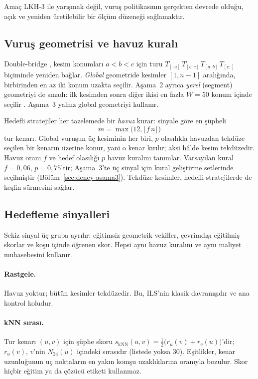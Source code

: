 \documentclass[pdflatex,sn-basic]{sn-jnl}
\begin{document}
Amaç LKH-3 ile yarışmak değil, vuruş politikasının gerçekten devrede olduğu, açık ve yeniden
üretilebilir bir ölçüm düzeneği sağlamaktır.

\subsection{Vuruş geometrisi ve havuz kuralı}\label{sec:yontem-kick}

Double-bridge \citep{martin_1992_largestep, lourenco_2010_ils}, kesim konumları $a<b<c$ için turu
$T_{[:a]}\,T_{[b:c]}\,T_{[a:b]}\,T_{[c:]}$ biçiminde yeniden bağlar. \emph{Global} geometride
kesimler $[1,n-1]$ aralığında, birbirinden en az iki konum uzakta seçilir. Aşama~2 ayrıca
\emph{yerel} (segment) geometriyi de sınadı: ilk kesimden sonra diğer ikisi en fazla $W=50$ konum
içinde seçilir \citep{applegate_2003_clk}. Aşama~3 yalnız global geometriyi kullanır.

Hedefli stratejiler her tazelemede bir \emph{havuz} kurar: sinyale göre en şüpheli
\[
  m=\max\bigl(12,\lfloor f\,n\rfloor\bigr)
\]
tur kenarı. Global vuruşun üç kesiminin her biri, $p$ olasılıkla havuzdan tekdüze seçilen bir
kenarın üzerine konur, yani o kenar kırılır; aksi hâlde kesim tekdüzedir. Havuz oranı $f$ ve hedef
olasılığı $p$ havuz kuralını tanımlar. Varsayılan kural $f=0{,}06$, $p=0{,}75$'tir; Aşama~3'te üç
sinyal için kural geliştirme setlerinde seçilmiştir (Bölüm~\ref{sec:deney-asama3}). Tekdüze
kesimler, hedefli stratejilerde de keşfin sürmesini sağlar.

\subsection{Hedefleme sinyalleri}\label{sec:yontem-sinyal}

Sekiz sinyal üç gruba ayrılır: eğitimsiz geometrik vekiller, çevrimdışı eğitilmiş skorlar ve koşu
içinde öğrenen skor. Hepsi aynı havuz kuralını ve aynı maliyet muhasebesini kullanır.

\paragraph{Rastgele.} Havuz yoktur; bütün kesimler tekdüzedir. Bu, ILS'nin klasik davranışıdır ve
ana kontrol koludur.

\paragraph{kNN sırası.} Tur kenarı $(u,v)$ için şüphe skoru
$s_{\mathrm{kNN}}(u,v)=\tfrac12\bigl(r_u(v)+r_v(u)\bigr)$'dir; $r_u(v)$, $v$'nin $N_{24}(u)$
içindeki sırasıdır (listede yoksa $30$). Eşitlikler, kenar uzunluğunun uç noktaların en yakın komşu
uzaklıklarına oranıyla bozulur. Skor hiçbir eğitim ya da çözücü etiketi kullanmaz.
\end{document}
